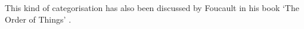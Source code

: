 This kind of categorisation has also been discussed by Foucault in his book `The Order of Things' \autocite{Foucault1966}.

%

\stopcontents[chapters]
